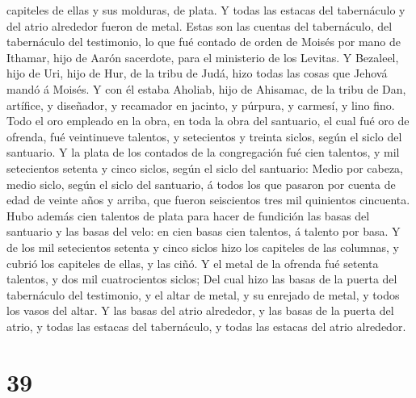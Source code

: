 capiteles de ellas y sus molduras, de plata.  Y todas las
estacas del tabernáculo y del atrio alrededor fueron de metal.
 Estas son las cuentas del tabernáculo, del tabernáculo
del testimonio, lo que fué contado de orden de Moisés por mano de
Ithamar, hijo de Aarón sacerdote, para el ministerio de los Levitas.
 Y Bezaleel, hijo de Uri, hijo de Hur, de la tribu de
Judá, hizo todas las cosas que Jehová mandó á Moisés.  Y
con él estaba Aholiab, hijo de Ahisamac, de la tribu de Dan, artífice, y
diseñador, y recamador en jacinto, y púrpura, y carmesí, y lino fino.
 Todo el oro empleado en la obra, en toda la obra del
santuario, el cual fué oro de ofrenda, fué veintinueve talentos, y
setecientos y treinta siclos, según el siclo del santuario.
 Y la plata de los contados de la congregación fué cien
talentos, y mil setecientos setenta y cinco siclos, según el siclo del
santuario:  Medio por cabeza, medio siclo, según el siclo
del santuario, á todos los que pasaron por cuenta de edad de veinte años
y arriba, que fueron seiscientos tres mil quinientos cincuenta.
 Hubo además cien talentos de plata para hacer de
fundición las basas del santuario y las basas del velo: en cien basas
cien talentos, á talento por basa.  Y de los mil
setecientos setenta y cinco siclos hizo los capiteles de las columnas, y
cubrió los capiteles de ellas, y las ciñó.  Y el metal de
la ofrenda fué setenta talentos, y dos mil cuatrocientos siclos;
 Del cual hizo las basas de la puerta del tabernáculo del
testimonio, y el altar de metal, y su enrejado de metal, y todos los
vasos del altar.  Y las basas del atrio alrededor, y las
basas de la puerta del atrio, y todas las estacas del tabernáculo, y
todas las estacas del atrio alrededor.

\hypertarget{section-38}{%
\section{39}\label{section-38}}

